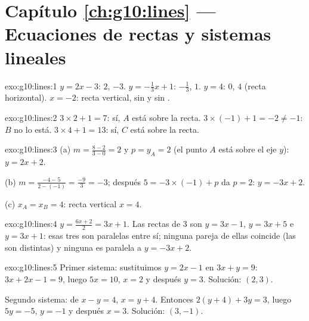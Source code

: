 \section*{Capítulo \ref{ch:g10:lines} --- Ecuaciones de rectas y sistemas lineales}

\begin{solution}{exo:g10:lines:1}
$y = 2x - 3$:  $2$,  $-3$.
$y = -\frac13 x + 1$:  $-\frac13$,  $1$.
$y = 4$:  $0$,  $4$ (recta horizontal).
$x = -2$: recta vertical, sin  y sin .
\end{solution}

\begin{solution}{exo:g10:lines:2}
$3 \times 2 + 1 = 7$: sí, $A$ está sobre la recta.
$3 \times (-1) + 1 = -2 \neq -1$: $B$ no lo está.
$3 \times 4 + 1 = 13$: sí, $C$ está sobre la recta.
\end{solution}

\begin{solution}{exo:g10:lines:3}
(a) $m = \frac{8 - 2}{3 - 0} = 2$ y $p = y_A = 2$ (el punto $A$ está sobre
el eje $y$): $y = 2x + 2$.

(b) $m = \frac{-4 - 5}{2 - (-1)} = \frac{-9}{3} = -3$; después
$5 = -3 \times (-1) + p$ da $p = 2$: $y = -3x + 2$.

(c) $x_A = x_B = 4$: recta vertical $x = 4$.
\end{solution}

\begin{solution}{exo:g10:lines:4}
$y = \frac{6x+2}{2} = 3x + 1$. Las rectas de  $3$ son
$y = 3x - 1$, $y = 3x + 5$ e $y = 3x + 1$: esas tres son paralelas entre
sí; ninguna pareja de ellas coincide (las  son
distintas) y ninguna es paralela a $y = -3x + 2$.
\end{solution}

\begin{solution}{exo:g10:lines:5}
Primer sistema: sustituimos $y = 2x - 1$ en $3x + y = 9$:
$3x + 2x - 1 = 9$, luego $5x = 10$, $x = 2$ y después $y = 3$. Solución:
$(2, 3)$.

Segundo sistema: de $x - y = 4$, $x = y + 4$. Entonces
$2(y + 4) + 3y = 3$, luego $5y = -5$, $y = -1$ y después $x = 3$.
Solución: $(3, -1)$.
\end{solution}

